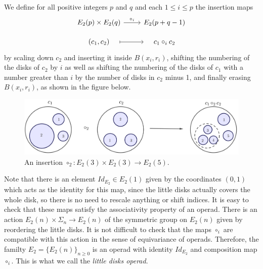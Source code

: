 \documentclass[TFM.tex]{subfiles}
\begin{document}
 
 
 We define for all positive integers $p$ and $q$ and  each $1\leq i\leq p$ the insertion maps 
 \[
 \begin{tikzcd}[row sep=10]
  E_2(p)\times E_2(q)\arrow[r, "\circ_i"] & E_2(p+q-1)\\
  (c_1,c_2)\arrow[r, mapsto, shorten <= 1em, shorten >= 1em] & c_1\circ_i c_2
 \end{tikzcd}
 \]
 by scaling down $c_2$ and inserting it inside $B(x_i,r_i)$, shifting the numbering of the disks of $c_2$ by $i$ as well as shifting the numbering of the disks of $c_1$ with a number greater than $i$ by the number of disks in $c_2$ minus 1, and finally erasing $B(x_i,r_i)$, as shown in the figure below. 
 \begin{figure}[h!]
  \centering
\includegraphics[scale=0.3]{Imagenes/insertion}
\caption{An insertion $\circ_2:E_2(3)\times E_2(3)\to E_2(5)$.}
 \end{figure}

Note that there is an element $Id_{E_2}\in E_2(1)$ given by the coordinates $(0,1)$ which acts as the identity for this map, since the little disks actually covers the whole disk, so there is no need to rescale anything or shift indices. It is easy to check that these maps satisfy the associativity property of an operad. There is an action $E_2(n)\times \Sigma_n\to E_2(n)$ of the symmetric group on $E_2(n)$ given by reordering the little disks. It is not difficult to check that the maps $\circ_i$ are compatible with this action in the sense of equivariance of operads. Therefore, the familty $E_2=\{E_2(n)\}_{n\geq 0}$ is an operad with identity $Id_{E_2}$ and composition map $\circ_i$. This is what we call the \emph{little disks operad}.



\end{document}
